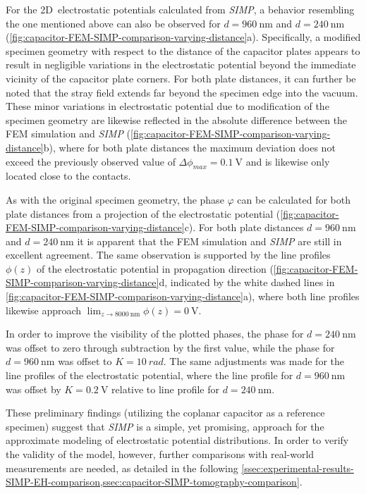 For the 2D~electrostatic potentials calculated from \emph{SIMP}, a behavior resembling the one mentioned above can also be observed for $d = \SI{960}{\nm}$ and $d = \SI{240}{\nm}$ (\cref{fig:capacitor-FEM-SIMP-comparison-varying-distance}a). Specifically, a modified specimen geometry with respect to the distance of the capacitor plates appears to result in negligible variations in the electrostatic potential beyond the immediate vicinity of the capacitor plate corners. For both plate distances, it can further be noted that the stray field extends far beyond the specimen edge into the vacuum. These minor variations in electrostatic potential due to modification of the specimen geometry are likewise reflected in the absolute difference between the FEM simulation and \emph{SIMP} (\cref{fig:capacitor-FEM-SIMP-comparison-varying-distance}b), where for both plate distances the maximum deviation does not exceed the previously observed value of $\Delta \phi_{\mathit{max}} = \SI{0.1}{\volt}$ and is likewise only located close to the contacts.

As with the original specimen geometry, the phase $\varphi$ can be calculated for both plate distances from a projection of the electrostatic potential (\cref{fig:capacitor-FEM-SIMP-comparison-varying-distance}c). For both plate distances $d = \SI{960}{\nm}$ and $d = \SI{240}{\nm}$ it is apparent that the FEM simulation and \emph{SIMP} are still in excellent agreement. The same observation is supported by the line profiles $\phi\left(z\right)$ of the electrostatic potential in propagation direction (\cref{fig:capacitor-FEM-SIMP-comparison-varying-distance}d, indicated by the white dashed lines in \cref{fig:capacitor-FEM-SIMP-comparison-varying-distance}a), where both line profiles likewise approach $\lim_{z\to\SI{8000}{\nm}} \phi\left(z\right) = \SI{0}{\volt}$.

In order to improve the visibility of the plotted phases, the phase for $d = \SI{240}{\nm}$ was offset to zero through subtraction by the first value, while the phase for $d = \SI{960}{\nm}$ was offset to $K = \SI{10}{rad}$. The same adjustments was made for the line profiles of the electrostatic potential, where the line profile for $d = \SI{960}{\nm}$ was offset by $K = \SI{0.2}{\volt}$ relative to line profile for $d = \SI{240}{\nm}$.

These preliminary findings (utilizing the coplanar capacitor as a reference specimen) suggest that \emph{SIMP} is a simple, yet promising, approach for the approximate modeling of electrostatic potential distributions. In order to verify the validity of the model, however, further comparisons with real-world measurements are needed, as detailed in the following \cref{ssec:experimental-results-SIMP-EH-comparison,ssec:capacitor-SIMP-tomography-comparison}.
\newpage
